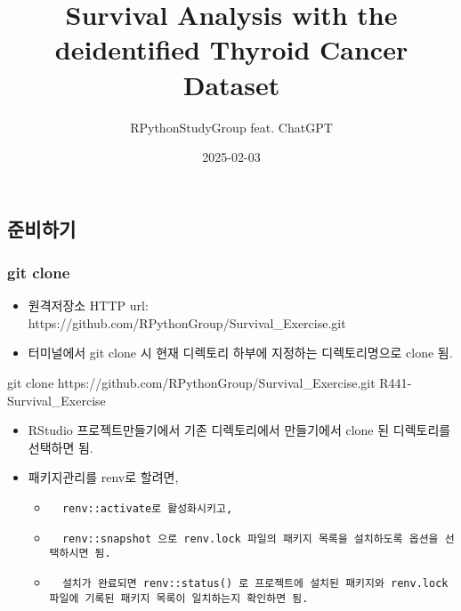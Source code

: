 \documentclass[
  letterpaper,
  DIV=11,
  numbers=noendperiod]{scrartcl}
\title{Survival Analysis with the deidentified Thyroid Cancer Dataset}
\author{RPythonStudyGroup feat. ChatGPT}
\date{2025-02-03}
\newenvironment{Shaded}{\begin{snugshade}}{\end{snugshade}}
\newcommand{\FunctionTok}[1]{\textcolor[rgb]{0.28,0.35,0.67}{#1}}
\newcommand{\NormalTok}[1]{\textcolor[rgb]{0.00,0.23,0.31}{#1}}
\providecommand{\tightlist}{%
  \setlength{\itemsep}{0pt}\setlength{\parskip}{0pt}}\usepackage{longtable,booktabs,array}
\begin{document}
\maketitle


\subsection{준비하기}\label{uxc900uxbe44uxd558uxae30}

\subsubsection{git clone}\label{git-clone}

\begin{itemize}
\tightlist
\item
  원격저장소 HTTP url:
  https://github.com/RPythonGroup/Survival\_Exercise.git
\item
  터미널에서 git clone 시 현재 디렉토리 하부에 지정하는 디렉토리명으로
  clone 됨.
\end{itemize}

\begin{Shaded}
\begin{Highlighting}[]
\FunctionTok{git}\NormalTok{ clone https://github.com/RPythonGroup/Survival\_Exercise.git R441{-}Survival\_Exercise}
\end{Highlighting}
\end{Shaded}

\begin{itemize}
\tightlist
\item
  RStudio 프로젝트만들기에서 기존 디렉토리에서 만들기에서 clone 된
  디렉토리를 선택하면 됨.
\item
  패키지관리를 renv로 할려면,

  \begin{itemize}
  \item
\begin{verbatim}
  renv::activate로 활성화시키고,
\end{verbatim}
  \item
\begin{verbatim}
  renv::snapshot 으로 renv.lock 파일의 패키지 목록을 설치하도록 옵션을 선택하시면 됨. 
\end{verbatim}
  \item
\begin{verbatim}
  설치가 완료되면 renv::status() 로 프로젝트에 설치된 패키지와 renv.lock 파일에 기록된 패키지 목록이 일치하는지 확인하면 됨.
\end{verbatim}
  \end{itemize}
\end{itemize}
\end{document}
